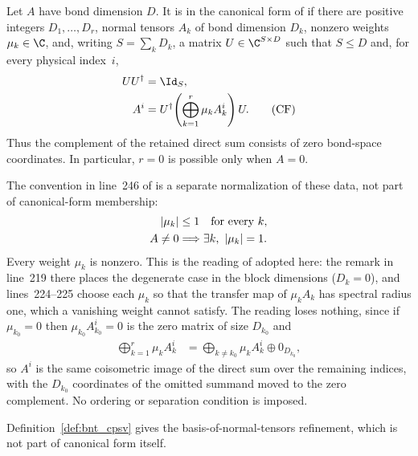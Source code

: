 \begin{definition}
    \label{def:cpsv_canonical_form}
    \leanok
    Let $A$ have bond dimension $D$. It is in the canonical
    form of \cite[Section~2.3]{Cirac2016MPDO_arXiv} if there are positive
    integers $D_1,\ldots,D_r$, normal tensors $A_k$ of bond dimension $D_k$,
    nonzero weights $\mu_k\in\C$, and, writing $S=\sum_kD_k$, a matrix
    $U\in\C^{S\times D}$ such that $S\le D$ and, for every physical index~$i$,
    \begin{align}
        UU^\dagger
         & =\Id_S,
        \notag                                                    \\
        A^i
         & =U^\dagger\!\left(\bigoplus_{k=1}^r\mu_kA_k^i\right)U.
        \tag{CF}\label{eq:cpsv_canonical_form}
    \end{align}
    Thus the complement of the retained direct sum consists of zero
    bond-space coordinates. In particular, $r=0$ is possible only when $A=0$.

    The convention in line~246 of \cite{Cirac2016MPDO_arXiv} is a separate
    normalization of these data, not part of canonical-form membership:
    \begin{align}
        |\mu_k|
         & \le1\quad\text{for every }k,
        \notag                                   \\
        A\ne0
         & \Longrightarrow\exists k,\ |\mu_k|=1.
        \label{eq:cpsv_weight_normalization}
    \end{align}
    Every weight $\mu_k$ is nonzero. This is the reading of
    \cite[Section~2.3]{Cirac2016MPDO_arXiv} adopted here: the remark in
    line~219 there places the degenerate case in the block dimensions
    ($D_k=0$), and lines~224--225 choose each $\mu_k$ so that the transfer map
    of $\mu_kA_k$ has spectral radius one, which a vanishing weight cannot
    satisfy. The reading loses nothing, since if $\mu_{k_0}=0$ then
    $\mu_{k_0}A_{k_0}^i=0$ is the zero matrix of size $D_{k_0}$ and
    \begin{align}
        \bigoplus_{k=1}^r\mu_kA_k^i
         & =\bigoplus_{k\ne k_0}\mu_kA_k^i\oplus0_{D_{k_0}},
        \label{eq:cpsv_zero_weight_summand}
    \end{align}
    so $A^i$ is the same coisometric image of the direct sum over the
    remaining indices, with the $D_{k_0}$ coordinates of the omitted summand
    moved to the zero complement. No ordering or separation condition is
    imposed.

    Definition~\ref{def:bnt_cpsv} gives the basis-of-normal-tensors refinement,
    which is not part of canonical form itself.
\end{definition}

